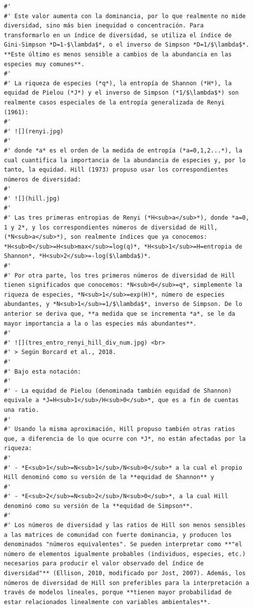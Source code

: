 \documentclass[11pt,]{article}
\begin{document}
\begin{verbatim}
#' 
#' Este valor aumenta con la dominancia, por lo que realmente no mide diversidad, sino más bien inequidad o concentración. Para transformarlo en un índice de diversidad, se utiliza el índice de Gini-Simpson *D=1-$\lambda$*, o el inverso de Simpson *D=1/$\lambda$*. **Este último es menos sensible a cambios de la abundancia en las especies muy comunes**.
#' 
#' La riqueza de especies (*q*), la entropía de Shannon (*H*), la equidad de Pielou (*J*) y el inverso de Simpson (*1/$\lambda$*) son realmente casos especiales de la entropía generalizada de Renyi (1961):
#' 
#' ![](renyi.jpg)
#' 
#' donde *a* es el orden de la medida de entropía (*a=0,1,2...*), la cual cuantifica la importancia de la abundancia de especies y, por lo tanto, la equidad. Hill (1973) propuso usar los correspondientes números de diversidad:
#' 
#' ![](hill.jpg)
#' 
#' Las tres primeras entropias de Renyi (*H<sub>a</sub>*), donde *a=0, 1 y 2*, y los correspondientes números de diversidad de Hill, (*N<sub>a</sub>*), son realmente índices que ya conocemos: *H<sub>0</sub>=H<sub>max</sub>=log(q)*, *H<sub>1</sub>=H=entropia de Shannon*, *H<sub>2</sub>=-log($\lambda$)*.
#' 
#' Por otra parte, los tres primeros números de diversidad de Hill tienen significados que conocemos: *N<sub>0</sub>=q*, simplemente la riqueza de especies, *N<sub>1</sub>=exp(H)*, número de especies abundantes, y *N<sub>1</sub>=1/$\lambda$*, inverso de Simpson. De lo anterior se deriva que, **a medida que se incrementa *a*, se le da mayor importancia a la o las especies más abundantes**.
#' 
#' ![](tres_entro_renyi_hill_div_num.jpg) <br> 
#' > Según Borcard et al., 2018.
#' 
#' Bajo esta notación:
#' 
#' - La equidad de Pielou (denominada también equidad de Shannon) equivale a *J=H<sub>1</sub>/H<sub>0</sub>*, que es a fin de cuentas una ratio.
#' 
#' Usando la misma aproximación, Hill propuso también otras ratios que, a diferencia de lo que ocurre con *J*, no están afectadas por la riqueza:
#' 
#' - *E<sub>1</sub>=N<sub>1</sub>/N<sub>0</sub>* a la cual el propio Hill denominó como su versión de la **equidad de Shannon** y
#' 
#' - *E<sub>2</sub>=N<sub>2</sub>/N<sub>0</sub>*, a la cual Hill denominó como su versión de la **equidad de Simpson**.
#' 
#' Los números de diversidad y las ratios de Hill son menos sensibles a las matrices de comunidad con fuerte dominancia, y producen los denominados "números equivalentes". Se pueden interpretar como **"el número de elementos igualmente probables (individuos, especies, etc.) necesarios para producir el valor observado del índice de diversidad"** (Ellison, 2010, modificado por Jost, 2007). Además, los números de diversidad de Hill son preferibles para la interpretación a través de modelos lineales, porque **tienen mayor probabilidad de estar relacionados linealmente con variables ambientales**.

\end{verbatim}
\end{document}
